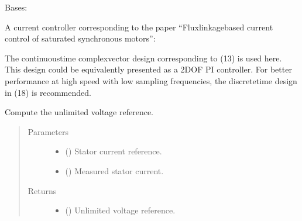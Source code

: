 \documentclass[letterpaper,10pt,english]{sphinxmanual}
\begin{document}
\begin{fulllineitems}
\label{\detokenize{control.im:control.im.vector.CurrentCtrl}}
\pysigstartsignatures
{}
\pysigstopsignatures
\sphinxAtStartPar
Bases: 

\sphinxAtStartPar
A current controller corresponding to the paper “Flux\sphinxhyphen{}linkage\sphinxhyphen{}based current
control of saturated synchronous motors”:
\begin{quote}

\sphinxAtStartPar
{}
\end{quote}

\sphinxAtStartPar
The continuous\sphinxhyphen{}time complex\sphinxhyphen{}vector design corresponding to (13) is used
here. This design could be equivalently presented as a 2DOF PI controller.
For better performance at high speed with low sampling frequencies, the
discrete\sphinxhyphen{}time design in (18) is recommended.

\begin{fulllineitems}
\label{\detokenize{control.im:control.im.vector.CurrentCtrl.output}}
\pysigstartsignatures
{}
\pysigstopsignatures
\sphinxAtStartPar
Compute the unlimited voltage reference.
\begin{quote}\begin{description}
\item[{Parameters}] \leavevmode\begin{itemize}
\item {} 
\sphinxAtStartPar
{} () \textendash{} Stator current reference.

\item {} 
\sphinxAtStartPar
{} () \textendash{} Measured stator current.

\end{itemize}

\item[{Returns}] \leavevmode
\sphinxAtStartPar
\begin{itemize}
\item {} 
\sphinxAtStartPar
{} () \textendash{} Unlimited voltage reference.


\end{itemize}
\end{description}
\end{quote}
\end{fulllineitems}
\end{fulllineitems}
\end{document}
